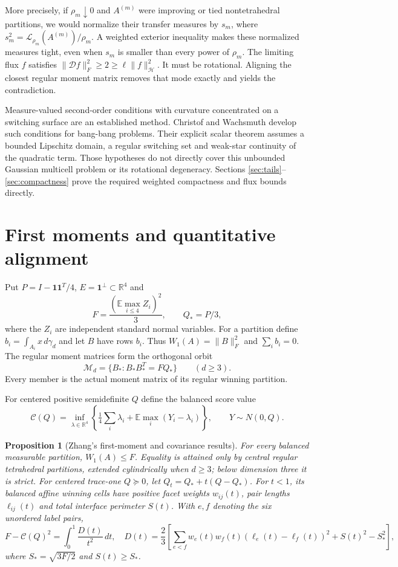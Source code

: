\documentclass[11pt,reqno]{amsart}
\newtheorem{proposition}[theorem]{Proposition}
\theoremstyle{remark}
\newcommand{\R}{\mathbb R}
\newcommand{\E}{\mathbb E}
\newcommand{\one}{\mathbf 1}
\newcommand{\norm}[1]{\lVert #1\rVert}
\newcommand{\ga}{\gamma}
\newcommand{\LL}{\mathcal L}
\newcommand{\HH}{\mathcal H}
\newcommand{\DD}{\mathcal D}
\begin{document}
More precisely, if $\rho_m\downarrow0$ and $A^{(m)}$ were improving or
tied nontetrahedral partitions, we would normalize their transfer measures
by $s_m$, where $s_m^2=\LL_{\rho_m}(A^{(m)})/\rho_m$.
A weighted exterior inequality makes these normalized measures tight,
even when $s_m$ is smaller than every power of $\rho_m$.
The limiting flux $f$ satisfies
$\norm{\DD f}_F^2\ge2\ge\ell\norm{f}_{\HH}^2$.
It must be rotational. Aligning the closest regular moment matrix removes
that mode exactly and yields the contradiction.

Measure-valued second-order conditions with curvature concentrated on a
switching surface are an established method. Christof and Wachsmuth
\cite[Theorems~4.4, 6.4 and~6.12 in version~2]{CW} develop such conditions
for bang-bang problems. Their explicit scalar theorem assumes a bounded
Lipschitz domain, a regular switching set and weak-star continuity of the
quadratic term. Those hypotheses do not directly cover this unbounded
Gaussian multicell problem or its rotational degeneracy. Sections
\ref{sec:tails}--\ref{sec:compactness} prove the required weighted
compactness and flux bounds directly.

\section{First moments and quantitative alignment}\label{sec:alignment}

Put $P=I-\one\one^T/4$, $E=\one^\perp\subset\R^4$ and
\[
 F=\frac{(\E\max_{i\le4}Z_i)^2}{3},\qquad Q_*=P/3,
\]
where the $Z_i$ are independent standard normal variables.
For a partition define $b_i=\int_{A_i}x\,d\ga_d$ and let $B$ have
rows $b_i$. Thus $W_1(A)=\norm{B}_F^2$ and $\sum_i b_i=0$.
The regular moment matrices form the orthogonal orbit
\[
 \mathcal M_d=\{B_*:B_*B_*^T=FQ_*\}\qquad(d\ge3).
\]
Every member is the actual moment matrix of its regular winning partition.

For centered positive semidefinite $Q$ define the balanced score value
\[
 \mathcal C(Q)=\inf_{\lambda\in\R^4}
 \left\{\tfrac14\sum_i\lambda_i+
 \E\max_i(Y_i-\lambda_i)\right\},\qquad Y\sim N(0,Q).
\]

\begin{proposition}[Zhang's first-moment and covariance results]\label{prop:zhang}
For every balanced measurable partition, $W_1(A)\le F$.
Equality is attained only by central regular tetrahedral partitions,
extended cylindrically when $d\ge3$; below dimension three it is strict.
For centered trace-one $Q\succeq0$, let $Q_t=Q_*+t(Q-Q_*)$.
For $t<1$, its balanced affine winning cells have positive facet weights
$w_{ij}(t)$, pair lengths $\ell_{ij}(t)$ and total interface perimeter
$S(t)$. With $e,f$ denoting the six unordered label pairs,
\begin{equation}\label{eq:cov-deficit}
 F-\mathcal C(Q)^2
 =\int_0^1\frac{D(t)}{t^2}\,dt,
 \quad
 D(t)=\frac23\left[
 \sum_{e<f}w_e(t)w_f(t)(\ell_e(t)-\ell_f(t))^2
 +S(t)^2-S_*^2\right],
\end{equation}
where $S_*=\sqrt{3F/2}$ and $S(t)\ge S_*$.
\end{proposition}
\end{document}
